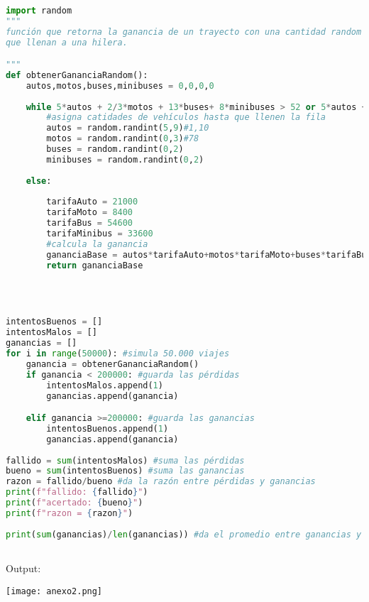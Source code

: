 \documentclass[a4paper]{article}
\begin{document}
\begin{lstlisting}[language=Python]
  
import random
"""
función que retorna la ganancia de un trayecto con una cantidad random de vehículos, 
que llenan a una hilera.

"""
def obtenerGananciaRandom():
    autos,motos,buses,minibuses = 0,0,0,0 
    
    while 5*autos + 2/3*motos + 13*buses+ 8*minibuses > 52 or 5*autos + 2/3*motos + 13*buses+ 8*minibuses < 48:
        #asigna catidades de vehículos hasta que llenen la fila
        autos = random.randint(5,9)#1,10
        motos = random.randint(0,3)#78
        buses = random.randint(0,2)
        minibuses = random.randint(0,2)
        
    else:
         
        tarifaAuto = 21000
        tarifaMoto = 8400
        tarifaBus = 54600
        tarifaMinibus = 33600
        #calcula la ganancia
        gananciaBase = autos*tarifaAuto+motos*tarifaMoto+buses*tarifaBus+minibuses*tarifaMinibus
        return gananciaBase  


    

intentosBuenos = []
intentosMalos = []
ganancias = []
for i in range(50000): #simula 50.000 viajes
    ganancia = obtenerGananciaRandom()
    if ganancia < 200000: #guarda las pérdidas
        intentosMalos.append(1)
        ganancias.append(ganancia)

    elif ganancia >=200000: #guarda las ganancias
        intentosBuenos.append(1)
        ganancias.append(ganancia)
        
fallido = sum(intentosMalos) #suma las pérdidas
bueno = sum(intentosBuenos) #suma las ganancias
razon = fallido/bueno #da la razón entre pérdidas y ganancias
print(f"fallido: {fallido}") 
print(f"acertado: {bueno}")
print(f"razon = {razon}")
    
print(sum(ganancias)/len(ganancias)) #da el promedio entre ganancias y pérdidas por columna luego de 50.000 intentos



\end{lstlisting} 

Output:
\begin{center}
    \texttt{[image: anexo2.png]}
\end{center}
\end{document}
